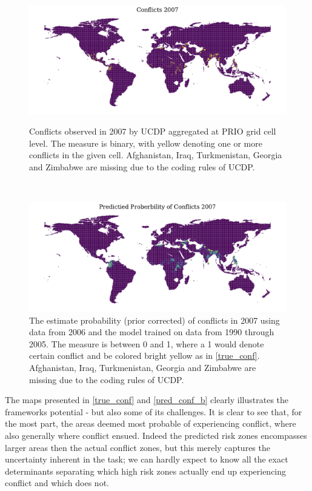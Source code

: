 \documentclass[a4paper]{article}
\begin{document}
\begin{figure}[!htb]%
  \centering
  \begin{minipage}[b]{1\textwidth}
    \includegraphics[width=\textwidth]{conflicts_2007.pdf}
    \caption{\footnotesize{Conflicts observed in 2007 by UCDP aggregated at PRIO grid cell level. The measure is binary, with yellow denoting one or more conflicts in the given cell. Afghanistan, Iraq, Turkmenistan, Georgia and Zimbabwe are missing due to the coding rules of UCDP.}}\label{true_conf}
  \end{minipage}
  \\	
  \begin{minipage}[b]{1\textwidth}
    \includegraphics[width=\textwidth]{pred_prob_conflicts_2007_bayes.pdf}
    \caption{\footnotesize{The estimate probability (prior corrected) of conflicts in 2007 using data from 2006 and the model trained on data from 1990 through 2005. The measure is between 0 and 1, where a 1 would denote certain conflict and be colored bright yellow as in \autoref{true_conf}. Afghanistan, Iraq, Turkmenistan, Georgia and Zimbabwe are missing due to the coding rules of UCDP.}}\label{pred_conf_b}
  \end{minipage}
\end{figure}

The maps presented in \autoref{true_conf} and \autoref{pred_conf_b} clearly illustrates the frameworks potential - but also some of its challenges. It is clear to see that, for the most part, the areas deemed most probable of experiencing conflict, where also generally where conflict ensued. Indeed the predicted risk zones encompasses larger areas then the actual conflict zones, but this merely captures the uncertainty inherent in the task; we can hardly expect to know all the exact determinants separating which high risk zones actually end up experiencing conflict and which does not.\par
\end{document}
